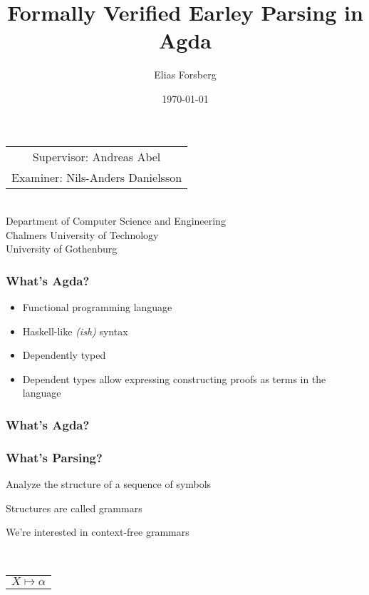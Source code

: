 \documentclass{beamer}
\begin{document}
	\title{Formally Verified Earley Parsing in Agda}
	\author{Elias Forsberg}
	\date{\today}
	
	\begin{frame}
		\maketitle
		\centering
		\begin{tabular}{c}
			Supervisor: Andreas Abel \\ Examiner: Nils-Anders Danielsson
		\end{tabular}\\
		\flushleft
		{\tiny Department of Computer Science and Engineering\\}
		{\tiny \sc Chalmers University of Technology\\}
		{\tiny \sc University of Gothenburg\\}
	
	\end{frame}
	

	\begin{frame}
		\frametitle{What's Agda?}

		\begin{itemize}
			\item Functional programming language
			\item Haskell-like \emph{(ish)} syntax
			\item Dependently typed
			\item Dependent types allow expressing constructing proofs as terms 
				in the language
		\end{itemize}
	\end{frame}

	\begin{frame}
		\frametitle{What's Agda?}
	\end{frame}

	\begin{frame}
		\frametitle{What's Parsing?}

		\begin{itemize*}
			\item Analyze the structure of a sequence of symbols
			\item Structures are called grammars
			\item We're interested in context-free grammars
		\end{itemize*}\\
		\vspace{0.5cm}
		\centering
		\begin{tabular}{c}
			$X \mapsto \alpha$ 
		\end{tabular}
		\vspace{2cm}

	\end{frame}
\end{document}
